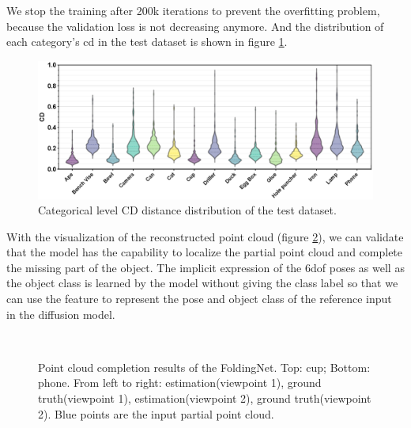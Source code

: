\documentclass[12pt,DIV14,BCOR12mm,a4paper,footinclude=false,headinclude,parskip=half-,twoside,openright,cleardoublepage=empty,toc=index,bibliography=totoc,listof=totoc]{scrreprt}
\numberwithin{equation}{chapter}
\begin{document}
We stop the training after 200k iterations to prevent the overfitting problem, because the validation loss is not decreasing anymore. And the distribution of each category's \gls{cd} in the test dataset is shown in figure \ref{img:cd_cate}.

\begin{figure}[h]
	\centering
	\includegraphics[width=1.\textwidth]{img/cd_category.eps}
	\caption{Categorical level CD distance distribution of the test dataset.}
	\label{img:cd_cate}
\end{figure}



With the visualization of the reconstructed point cloud (figure \ref{img:comp_all}), we can validate that the model has the capability to localize the partial point cloud and complete the missing part of the object. The implicit expression of the \gls{6dof} poses as well as the object class is learned by the model without giving the class label so that we can use the feature to represent the pose and object class of the reference input in the diffusion model.

\begin{figure}[h]
	\centering
	\\
  \centering
	\caption{Point cloud completion results of the FoldingNet. Top: cup; Bottom: phone. From left to right: estimation(viewpoint 1), ground truth(viewpoint 1), estimation(viewpoint 2), ground truth(viewpoint 2). Blue points are the input partial point cloud.}
	\label{img:comp_all}
\end{figure}
\end{document}
